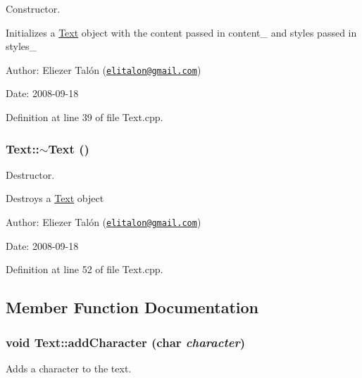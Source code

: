 Constructor. 

Initializes a \hyperlink{class_text}{Text} object with the content passed in content\_\- and styles passed in styles\_\-

\begin{Desc}
\item[Author:]Eliezer Talón (\href{mailto:elitalon@gmail.com}{\tt elitalon@gmail.com}) \end{Desc}
\begin{Desc}
\item[Date:]2008-09-18 \end{Desc}


Definition at line 39 of file Text.cpp.\hypertarget{class_text_2d49e5c280e205125b149f7777ae30c7}{
\subsubsection[$\sim$Text]{\setlength{\rightskip}{0pt plus 5cm}Text::$\sim$Text ()}}
\label{class_text_2d49e5c280e205125b149f7777ae30c7}


Destructor. 

Destroys a \hyperlink{class_text}{Text} object

\begin{Desc}
\item[Author:]Eliezer Talón (\href{mailto:elitalon@gmail.com}{\tt elitalon@gmail.com}) \end{Desc}
\begin{Desc}
\item[Date:]2008-09-18 \end{Desc}


Definition at line 52 of file Text.cpp.

\subsection{Member Function Documentation}
\hypertarget{class_text_f30df66d8aa08a4e202512a358534f6c}{
\subsubsection[addCharacter]{\setlength{\rightskip}{0pt plus 5cm}void Text::addCharacter (char {\em character})}}
\label{class_text_f30df66d8aa08a4e202512a358534f6c}


Adds a character to the text. 

